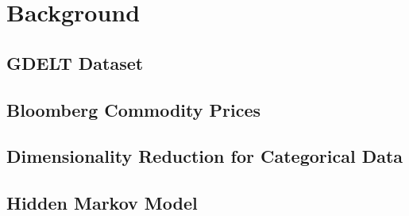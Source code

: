 
\section{Background}
\subsection{GDELT Dataset}



\subsection{Bloomberg Commodity Prices}

\subsection{Dimensionality Reduction for Categorical Data}


\subsection{Hidden Markov Model}